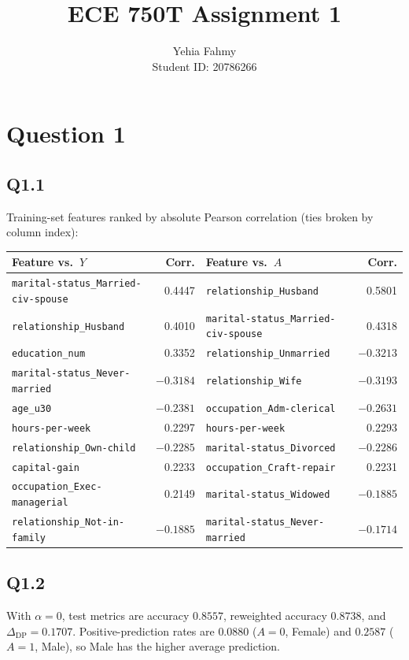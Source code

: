 \documentclass[11pt]{article}
\title{ECE 750T Assignment 1}
\author{Yehia Fahmy\\Student ID: 20786266}
\date{}
\newcommand{\DP}{\Delta_{\mathrm{DP}}}
\begin{document}
\maketitle

\section*{Question 1}

\subsection*{Q1.1}
Training-set features ranked by absolute Pearson correlation (ties broken by column index):

\begin{center}
\footnotesize
\begin{tabular}{lr@{\hspace{1.5em}}lr}
\toprule
Feature vs.\ $Y$ & Corr. & Feature vs.\ $A$ & Corr. \\
\midrule
\texttt{marital-status\_Married-civ-spouse} & 0.4447 &
\texttt{relationship\_Husband} & 0.5801 \\
\texttt{relationship\_Husband} & 0.4010 &
\texttt{marital-status\_Married-civ-spouse} & 0.4318 \\
\texttt{education\_num} & 0.3352 &
\texttt{relationship\_Unmarried} & $-0.3213$ \\
\texttt{marital-status\_Never-married} & $-0.3184$ &
\texttt{relationship\_Wife} & $-0.3193$ \\
\texttt{age\_u30} & $-0.2381$ &
\texttt{occupation\_Adm-clerical} & $-0.2631$ \\
\texttt{hours-per-week} & 0.2297 &
\texttt{hours-per-week} & 0.2293 \\
\texttt{relationship\_Own-child} & $-0.2285$ &
\texttt{marital-status\_Divorced} & $-0.2286$ \\
\texttt{capital-gain} & 0.2233 &
\texttt{occupation\_Craft-repair} & 0.2231 \\
\texttt{occupation\_Exec-managerial} & 0.2149 &
\texttt{marital-status\_Widowed} & $-0.1885$ \\
\texttt{relationship\_Not-in-family} & $-0.1885$ &
\texttt{marital-status\_Never-married} & $-0.1714$ \\
\bottomrule
\end{tabular}
\end{center}

\subsection*{Q1.2}
With $\alpha=0$, test metrics are accuracy $0.8557$, reweighted accuracy $0.8738$, and $\DP=0.1707$. Positive-prediction rates are $0.0880$ ($A=0$, Female) and $0.2587$ ($A=1$, Male), so Male has the higher average prediction.
\end{document}

